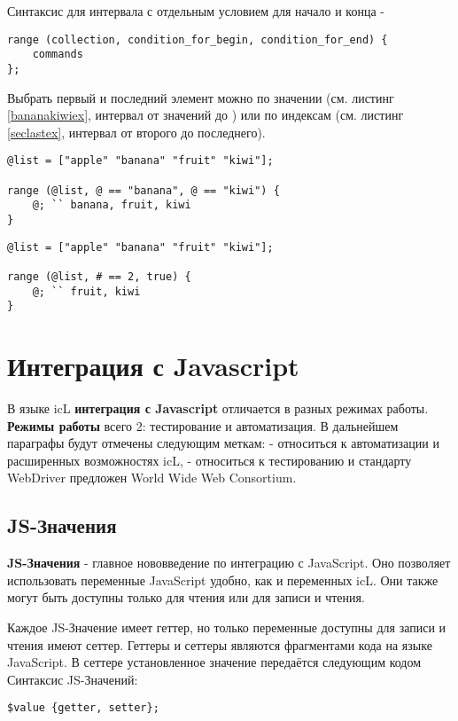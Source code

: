 \documentclass[a4paper, 14pt]{extarticle}
\begin{document}
Синтаксис для интервала с отдельным условием для начало и конца -
\begin{lstlisting}[numbers=none]
range (collection, condition_for_begin, condition_for_end) {
	commands
};
\end{lstlisting}

Выбрать первый и последний элемент можно по значении (см. листинг \ref{bananakiwiex}, интервал от значений  до ) или по индексам (см. листинг \ref{seclastex}, интервал от второго до последнего).

\begin{lstlisting}[caption=Интервал: от banana до kiwi, label=bananakiwiex]
@list = ["apple" "banana" "fruit" "kiwi"];

range (@list, @ == "banana", @ == "kiwi") {
	@; `` banana, fruit, kiwi
}
\end{lstlisting}

\begin{lstlisting}[caption=Интервал: от второго до последнего, label=seclastex]
@list = ["apple" "banana" "fruit" "kiwi"];

range (@list, # == 2, true) {
	@; `` fruit, kiwi
}
\end{lstlisting}

\newpage
\section{Интеграция с Javascript}

В языке icL {\bf интеграция с Javascript} отличается в разных режимах работы. {\bf Режимы работы} всего 2: тестирование и автоматизация. В дальнейшем параграфы будут отмечены следующим меткам: \code{[icL]} - относиться к автоматизации и расширенных возможностях icL, \code{[w3c]} - относиться к тестированию и стандарту WebDriver предложен World Wide Web Consortium.

\subsection{JS-Значения}

{\bf JS-Значения} - главное нововведение по интеграцию с JavaScript. Оно позволяет использовать переменные JavaScript удобно, как и переменных icL. Они также могут быть доступны только для чтения или для записи и чтения.

Каждое JS-Значение имеет геттер, но только переменные доступны для записи и чтения имеют сеттер. Геттеры и сеттеры являются фрагментами кода на языке JavaScript. В сеттере установленное значение передаётся следующим кодом  Синтаксис JS-Значений:
\begin{lstlisting}[numbers=none]
$value {getter, setter};
\end{lstlisting}
\end{document}

